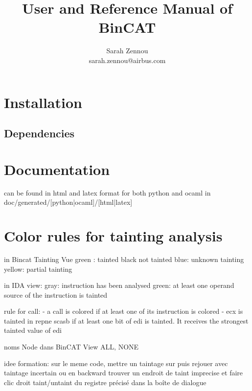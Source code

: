 \documentclass{report}
\title{User and Reference Manual of BinCAT}
\author{Sarah Zennou\\sarah.zennou@airbus.com}
\begin{document}
\maketitle
\tableofcontents
\chapter{Installation}

\section{Dependencies}
\chapter{Documentation}

can be found in html and latex format for both python and ocaml \newline
in doc/generated/[python|ocaml]/[html|latex]

\chapter{Color rules for tainting analysis}
in Bincat Tainting Vue
green : tainted
black not tainted
blue: unknown tainting
yellow: partial tainting

in IDA view:
gray: instruction has been analysed
green: at least one operand source of the instruction is tainted

rule for call:
- a call is colored if at least one of its instruction is colored
- ecx is tainted in repne scasb if at least one bit of edi is tainted. It receives the strongest tainted value of edi

noms Node dans BinCAT View
ALL, NONE

idee formation:
sur le meme code, mettre un taintage sur puis rejouer avec taintage incertain ou en backward
trouver un endroit de taint imprecise et faire clic droit taint/untaint du registre précisé dans la boîte de dialogue
\end{document}
